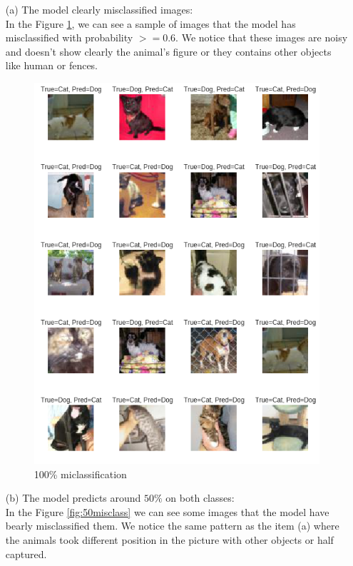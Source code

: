 \documentclass[a4paper]{article}
\begin{document}
\begin{itemize}
	\item[(a)] The model clearly misclassified images:\\
	In the Figure \ref{fig:100misclass}, we can see a sample of images that the model has misclassified with probability $>= 0.6$.
	We notice that these images are noisy and doesn't show clearly the animal's figure or they contains other objects like human or fences.
	
	\begin{figure}[h!]
		\centering
		\includegraphics[scale=.4]{100misclass.png}
		\caption{100\% miclassification}
		\label{fig:100misclass}
	\end{figure}

\item[(b)] The model predicts around $50\%$ on both classes:\\
In the Figure \ref{fig:50misclass} we can see some images that the model have bearly misclassified them. We notice the same pattern as the item (a) where the animals took different position in the picture with other objects or half captured.



\end{itemize}
\end{document}
